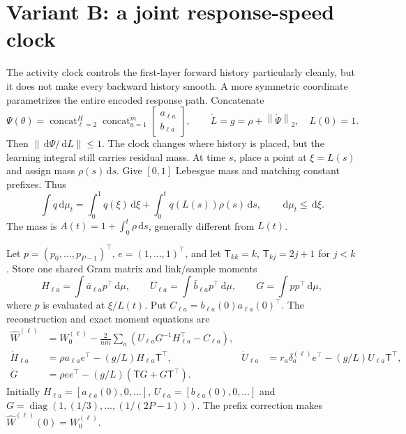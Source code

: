 \documentclass[11pt]{article}
\theoremstyle{definition}
\theoremstyle{remark}
\newcommand{\norm}[1]{\left\lVert #1\right\rVert}
\newcommand{\dd}{\,\mathrm{d}}
\newcommand{\diag}{\operatorname{diag}}
\begin{document}
\section{Variant B: a joint response-speed clock}
\label{sec:new-clock}

The activity clock controls the first-layer forward history particularly
cleanly, but it does not make every backward history smooth.  A more symmetric
coordinate parametrizes the entire encoded response path.  Concatenate
\begin{equation}
 \Psi(\theta)=\operatorname{concat}_{\ell=2}^{H}
 \operatorname{concat}_{a=1}^{m}
 \begin{bmatrix}a_{\ell a}\\ b_{\ell a}\end{bmatrix},\qquad
 \dot L=g=\rho+\norm{\dot\Psi}_2,\quad L(0)=1.        \label{eq:new-clock}
\end{equation}
Then $\norm{\dd\Psi/\dd L}\le1$.  The clock changes where history is placed,
but the learning integral still carries residual mass.  At time $s$, place a
point at $\xi=L(s)$ and assign mass $\rho(s)\dd s$.  Give $[0,1]$ Lebesgue
mass and matching constant prefixes.  Thus
\[
 \int q\dd\mu_t=\int_0^1q(\xi)\dd\xi+
 \int_0^tq(L(s))\rho(s)\dd s,\qquad \dd\mu_t\le\dd\xi.
\]
The mass is $A(t)=1+\int_0^t\rho\dd s$, generally different from $L(t)$.

Let $p=(p_0,\ldots,p_{P-1})^\top$, $e=(1,\ldots,1)^\top$, and let
$\mathsf T_{kk}=k$, $\mathsf T_{kj}=2j+1$ for $j<k$.  Store one shared Gram
matrix and link/sample moments
\[
 H_{\ell a}=\int\bar a_{\ell a}p^\top\dd\mu,\qquad
 U_{\ell a}=\int\bar b_{\ell a}p^\top\dd\mu,\qquad
 G=\int pp^\top\dd\mu,
\]
where $p$ is evaluated at $\xi/L(t)$.  Put
$C_{\ell a}=b_{\ell a}(0)a_{\ell a}(0)^\top$.  The reconstruction and exact
moment equations are
\begin{align}
 \widehat W^{(\ell)}&=W_0^{(\ell)}-\frac{2}{nm}\sum_a
 (U_{\ell a}G^{-1}H_{\ell a}^\top-C_{\ell a}),       \label{eq:new-recon}\\
 \dot H_{\ell a}&=\rho a_{\ell a}e^\top-(g/L)H_{\ell a}\mathsf T^\top,
 &\dot U_{\ell a}&=r_a\delta_a^{(\ell)}e^\top-(g/L)U_{\ell a}\mathsf T^\top,
 \nonumber\\
 \dot G&=\rho ee^\top-(g/L)(\mathsf TG+G\mathsf T^\top). \label{eq:new-ode}
\end{align}
Initially $H_{\ell a}=[a_{\ell a}(0),0,\ldots]$,
$U_{\ell a}=[b_{\ell a}(0),0,\ldots]$ and
$G=\diag(1,(1/3),\ldots,(1/(2P-1)))$.  The prefix correction makes
$\widehat W^{(\ell)}(0)=W_0^{(\ell)}$.
\end{document}
